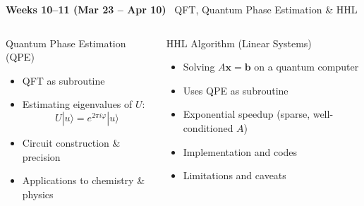 \documentclass[aspectratio=169,12pt]{beamer}
\newcommand{\ket}[1]{|#1\rangle}
\newcommand{\week}[1]{\textcolor{qgold}{\textbf{#1}}}
\begin{document}
\begin{frame}{\week{Weeks 10--11 (Mar 23 -- Apr 10)} \ QFT, Quantum Phase Estimation \& HHL}
  \begin{columns}[T]
      \begin{block}{Quantum Phase Estimation (QPE)}
        \begin{itemize}
          \item QFT as subroutine
          \item Estimating eigenvalues of $U$:
                \[
                  U\ket{u} = e^{2\pi i\varphi}\ket{u}
                \]
          \item Circuit construction \& precision
          \item Applications to chemistry \& physics
        \end{itemize}
      \end{block}
      \begin{block}{HHL Algorithm (Linear Systems)}
        \begin{itemize}
          \item Solving $A\bm{x}=\bm{b}$ on a quantum computer
          \item Uses QPE as subroutine
          \item Exponential speedup (sparse, well-conditioned $A$)
          \item Implementation and codes
          \item Limitations and caveats
        \end{itemize}
      \end{block}
  \end{columns}
\end{frame}
\end{document}
